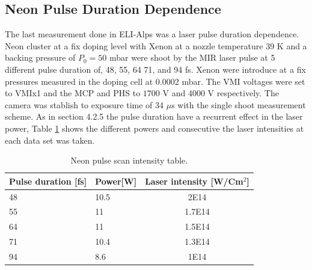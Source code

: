 \subsection{Neon Pulse Duration Dependence}

The last measurement done in ELI-Alps was a laser pulse duration dependence. Neon cluster at a fix doping level with Xenon at a  nozzle temperature 39 K and a backing pressure of $P_{0}=50$ mbar  were shoot by the MIR laser pulse at 5 different pulse duration of, 48, 55, 64 71, and 94 fs. Xenon were introduce at a fix pressures measured in the doping cell at 0.0002 mbar. The VMI voltages were set to VMIx1 and the MCP and PHS to $1700$ V and $4000$ V respectively. The camera was stablish to exposure time of 34 $\mu$s with the single shoot measurement scheme. As in section 4.2.5 the pulse duration have a recurrent effect in the laser power, Table \ref{tab:Neonpulsepower} shows the different powers and consecutive the laser intensities at each data set was taken.

\begin{table}[t]
\centering

\begin{tabular}{|l|l|c|}
\hline
Pulse duration {[}fs{]} & \multicolumn{1}{c|}{Power{[}W{]}} & Laser intensity {[}W/Cm$^{2}${]} \\ \hline
48 & 10.5 & 2E14 \\ \hline
55 & 11 & 1.7E14 \\ \hline
64 & 11 & 1.5E14 \\ \hline
71 & 10.4 & 1.3E14 \\ \hline
94 & 8.6 & 1E14 \\ \hline
\end{tabular}
\caption{Neon pulse scan  intensity table.}
\label{tab:Neonpulsepower}
\end{table}



